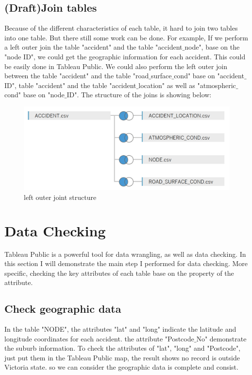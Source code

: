 \documentclass[11pt]{article}
\theoremstyle{definition}
\begin{document}
\subsection{(Draft)Join tables}
\label{JoinTable}
Because of the different characteristics of each table, it hard to join two tables into one table. But there still some work can be done. For example, If we perform a left outer join the table "accident" and the table "accident$\_$node", base on the "node ID", we could get the geographic information for each accident. This could be easily done in Tableau Public. We could also perform the left outer join between the table "accident" and  the table "road$\_$surface$\_$cond" base on "accident$\_$ID", table "accident" and the table "accident$\_$location" as well as "atmospheric$\_$cond" base on "node$\_$ID". The structure of the joins is showing below:
\begin{figure}[h!]
	\begin{center}
		\includegraphics[scale=0.8]{images/leftouterjoin.png} 
	\end{center}
 	\label{fig:leftOuterJoin}
\caption{left outer joint structure}
\end{figure}


\section{Data Checking}
\label{dataChecking}
Tableau Public is a powerful tool for data wrangling, as well as data checking. In this section I will demonstrate the main step I performed for data checking. More specific, checking the key attributes of each table base on the property of the attribute. \\

\subsection{Check geographic data}
In the table "NODE", the attributes "lat" and "long" indicate the latitude and longitude coordinates for each accident. the attribute "Postcode$\_$No" demonstrate the suburb information. To check the attributes of "lat", "long" and "Postcode", just put them in the Tableau Public map, the result shows no record is outside Victoria state. so we can consider the geographic data is complete and consist.\par
\end{document}
